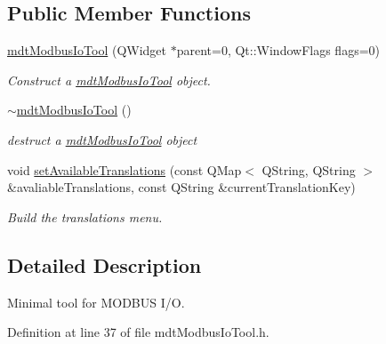 \subsection*{Public Member Functions}
\begin{DoxyCompactItemize}
\item 
\hyperlink{classmdt_modbus_io_tool_a8ce66aaa36a5e1f5569eaf00f01f28c6}{mdtModbusIoTool} (QWidget $\ast$parent=0, Qt::WindowFlags flags=0)
\begin{DoxyCompactList}\small\item\em Construct a \hyperlink{classmdt_modbus_io_tool}{mdtModbusIoTool} object. \end{DoxyCompactList}\item 
\hypertarget{classmdt_modbus_io_tool_a4321c2d67a52e135dba99a053ef26547}{
\hyperlink{classmdt_modbus_io_tool_a4321c2d67a52e135dba99a053ef26547}{$\sim$mdtModbusIoTool} ()}
\label{classmdt_modbus_io_tool_a4321c2d67a52e135dba99a053ef26547}

\begin{DoxyCompactList}\small\item\em destruct a \hyperlink{classmdt_modbus_io_tool}{mdtModbusIoTool} object \end{DoxyCompactList}\item 
\hypertarget{classmdt_modbus_io_tool_a5609881a00e48c8cbd0047c3c6a15ff5}{
void \hyperlink{classmdt_modbus_io_tool_a5609881a00e48c8cbd0047c3c6a15ff5}{setAvailableTranslations} (const QMap$<$ QString, QString $>$ \&avaliableTranslations, const QString \&currentTranslationKey)}
\label{classmdt_modbus_io_tool_a5609881a00e48c8cbd0047c3c6a15ff5}

\begin{DoxyCompactList}\small\item\em Build the translations menu. \end{DoxyCompactList}\end{DoxyCompactItemize}


\subsection{Detailed Description}
Minimal tool for MODBUS I/O. 

Definition at line 37 of file mdtModbusIoTool.h.



